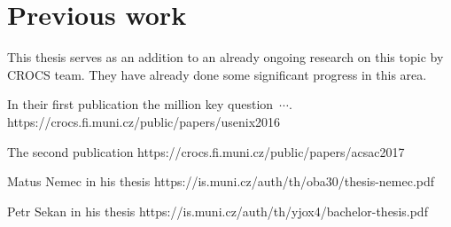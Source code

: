 \chapter{Previous work}

This thesis serves as an addition to an already ongoing research on this topic by CROCS team. They have already done some significant progress in this area.

In their first publication the million key question\ $\cdots$. https://crocs.fi.muni.cz/public/papers/usenix2016

The second publication https://crocs.fi.muni.cz/public/papers/acsac2017

Matus Nemec in his thesis https://is.muni.cz/auth/th/oba30/thesis-nemec.pdf

Petr Sekan in his thesis https://is.muni.cz/auth/th/yjox4/bachelor-thesis.pdf